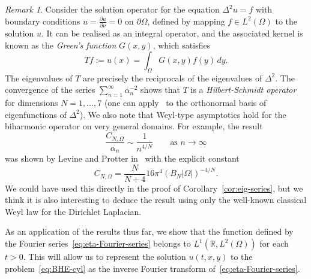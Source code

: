 \documentclass[a4paper, reqno]{amsart}
\numberwithin{equation}{section}
\theoremstyle{plain}
\theoremstyle{definition}
\theoremstyle{remark}
\newtheorem{remark}[theorem]{Remark}
\newcommand{\RR}{\mathbb{R}}
\begin{document}
\begin{remark}
  Consider the solution operator for the equation $\Delta^2 u = f$ with boundary conditions $u = \frac{\partial u}{\partial \nu} = 0$ on $\partial\Omega$, defined by mapping $f \in L^2(\Omega)$ to the solution $u$. It can be realised as an integral operator, and the associated kernel is known as the \emph{Green's function} $G(x,y)$, which satisfies
  \begin{equation*}
    Tf := u(x) = \int_\Omega G(x,y)f(y) \,dy.
  \end{equation*}
  The eigenvalues of $T$ are precisely the reciprocals of the eigenvalues of $\Delta^2$. The convergence of the series $\sum_{n=1}^\infty \alpha_n^{-2}$ shows that $T$ is a \emph{Hilbert-Schmidt operator} for dimensions $N=1,\ldots,7$ (one can apply~\cite[Theorem 4.5]{Hal} to the orthonormal basis of eigenfunctions of $\Delta^2$). We also note that Weyl-type asymptotics hold for the biharmonic operator on very general domains. For example, the result
  \begin{equation}
    \frac{C_{N,\Omega}}{\alpha_n} \sim \frac{1}{n^{4/N}} \qquad \text{as } n \to \infty
  \end{equation}
  was shown by Levine and Protter in~\cite{LP} with the explicit constant
  \begin{equation*}
    C_{N,\Omega} = \frac{N}{N+4} 16\pi^4 (B_N|\Omega|)^{-4/N}.
  \end{equation*}
  We could have used this directly in the proof of Corollary~\ref{cor:eig-series}, but we think it is also interesting to deduce the result using only the well-known classical Weyl law for the Dirichlet Laplacian.
\end{remark}

As an application of the results thus far, we show that the function defined by the Fourier series~\eqref{eq:eta-Fourier-series} belongs to $L^1(\RR, L^2(\Omega))$ for each $t > 0$. This will allow us to represent the solution $u(t,x,y)$ to the problem~\eqref{eq:BHE-cyl} as the inverse Fourier transform of~\eqref{eq:eta-Fourier-series}.
\end{document}
